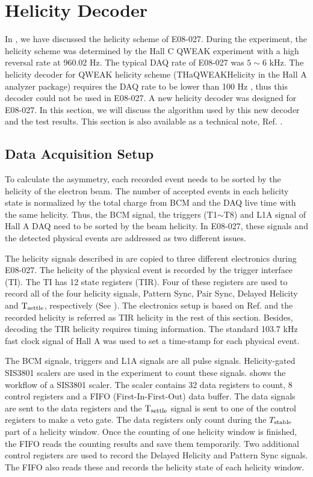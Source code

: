 
\chapter{Helicity Decoder}
\label{A1}

In , we have discussed the helicity scheme of E08-027. During the experiment, the helicity scheme was determined by the Hall C QWEAK experiment with a high reversal rate at 960.02 Hz. The typical DAQ rate of E08-027 was $5\sim6$ kHz. The helicity decoder for QWEAK helicity scheme (THaQWEAKHelicity in the Hall A analyzer package) requires the DAQ rate to be lower than 100 Hz \cite{Hansen2015}, thus this decoder could not be used in E08-027. A new helicity decoder was designed for E08-027. In this section, we will discuss the algorithm used by this new decoder and the test results. This section is also available as a technical note, Ref. \cite{Gu2014}.

\section{Data Acquisition Setup}
\label{A1S1}

To calculate the asymmetry, each recorded event needs to be sorted by the helicity of the electron beam. The number of accepted events in each helicity state is normalized by the total charge from BCM and the DAQ live time with the same helicity. Thus, the BCM signal, the triggers (T1$\sim$T8) and L1A signal of Hall A DAQ need to be sorted by the beam helicity. In E08-027, these signals and the detected physical events are addressed as two different issues.

The helicity signals described in  are copied to three different electronics during E08-027. The helicity of the physical event is recorded by the trigger interface (TI). The TI has 12 state registers (TIR). Four of these registers are used to record all of the four helicity signals, Pattern Sync, Pair Sync, Delayed Helicity and $\mathrm{T}_{\mathrm{settle}}$, respectively (See ). The electronics setup is based on Ref. \cite{Michaels2010} and the recorded helicity is referred as TIR helicity in the rest of this section. Besides, decoding the TIR helicity requires timing information. The standard 103.7 kHz fast clock signal of Hall A was used to set a time-stamp for each physical event.

The BCM signals, triggers and L1A signals are all pulse signals. Helicity-gated SIS3801 scalers are used in the experiment to count these signals.  shows the workflow of a SIS3801 scaler. The scaler contains 32 data registers to count, 8 control registers and a FIFO (First-In-First-Out) data buffer. The data signals are sent to the data registers and the $\mathrm{T}_{\mathrm{settle}}$ signal is sent to one of the control registers to make a veto gate. The data registers only count during the $T_{\mathrm{stable}}$ part of a helicity window. Once the counting of one helicity window is finished, the FIFO reads the counting results and save them temporarily. Two additional control registers are used to record the Delayed Helicity and Pattern Sync signals. The FIFO also reads these and records the helicity state of each helicity window.

